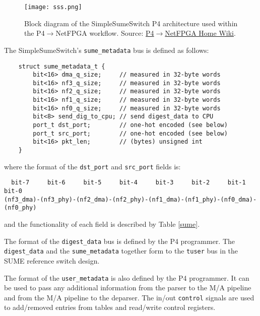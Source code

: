 \begin{figure}[!ht]
	\centering
	\texttt{[image: sss.png]}
	\caption{Block diagram of the SimpleSumeSwitch P4 architecture used within the P4$\rightarrow$NetFPGA workflow. Source: \href{https://github.com/NetFPGA/P4-NetFPGA-public/wiki/Workflow-Overview\#simplesumeswitch-architecture}{P4$\rightarrow$NetFPGA Home Wiki}.} 
	\label{sss}
\end{figure}

The SimpleSumeSwitch’s \verb|sume_metadata| bus is defined as follows:

{\renewcommand{\baselinestretch}{0.8}\small
	\begin{verbatim}
    struct sume_metadata_t {
        bit<16> dma_q_size;     // measured in 32-byte words
        bit<16> nf3_q_size;     // measured in 32-byte words
        bit<16> nf2_q_size;     // measured in 32-byte words
        bit<16> nf1_q_size;     // measured in 32-byte words
        bit<16> nf0_q_size;     // measured in 32-byte words
        bit<8> send_dig_to_cpu; // send digest_data to CPU
        port_t dst_port;        // one-hot encoded (see below)
        port_t src_port;        // one-hot encoded (see below)
        bit<16> pkt_len;        // (bytes) unsigned int
    }
	\end{verbatim}
}

where the format of the \verb|dst_port| and \verb|src_port| fields is:

{\renewcommand{\baselinestretch}{0.8}\small
\begin{verbatim}
  bit-7     bit-6     bit-5     bit-4     bit-3     bit-2     bit-1     bit-0
(nf3_dma)-(nf3_phy)-(nf2_dma)-(nf2_phy)-(nf1_dma)-(nf1_phy)-(nf0_dma)-(nf0_phy)
\end{verbatim}
}

and the functionality of each field is described by Table \ref{sume}. 

The format of the \verb|digest_data| bus is defined by the P4 programmer. The \verb|digest_data| and the \verb|sume_metadata| together form to the \texttt{tuser} bus in the SUME reference switch design.

The format of the \verb|user_metadata| is also defined by the P4 programmer. It can be used to pass any additional information from the parser to the M/A pipeline and from the M/A pipeline to the deparser. The in/out \verb|control| signals are used to add/removed entries from tables and read/write control registers.

